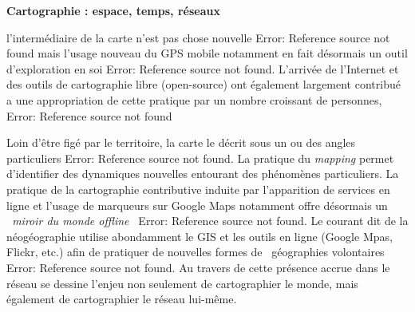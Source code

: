 \bigskip

{\bfseries\color{black}
Cartographie : espace, temps, r\'eseaux}

{\color{black}
\textsf{l'interm\'ediaire de la carte n'est pas chose nouvelle }\textsf{Error: Reference source not found}\textsf{ mais
l'usage nouveau d}\textsf{u GPS }\textsf{mobile notamment en fait d\'esormais un outil d'exploration en soi
}\textsf{Error: Reference source not found}\textsf{. L'arriv\'ee de l'Internet et des outils de cartographie libre
(open-source) ont \'egalement largement contribu\'e a une appropriation de cette pratique par un nombre croissant de
personnes, }\textsf{Error: Reference source not found}}


\bigskip

{\color{black}
\textsf{Loin d'\^etre fig\'e par le territoire, la carte le d\'ecrit sous un ou des angles particuliers }\textsf{Error:
Reference source not found}\textsf{. La pratique du }\textsf{\textit{mapping}}\textsf{ permet d'identifier des
dynamiques nouvelles entourant des ph\'enom\`enes particuliers. La pratique de la cartographie contributive induite par
l'apparition de services en ligne et l'usage de marqueurs sur Google Maps notamment offre d\'esormais un
}\textsf{\textit{{\guillemotleft}~miroir du monde offline~{\guillemotright}}}\textsf{ }\textsf{Error: Reference source
not found}\textsf{. Le courant dit de la n\'eog\'eographie utilise abondamment le GIS et les outils en ligne (Google
Mpas, Flickr, etc.) afin de pratiquer de nouvelles formes de {\guillemotleft}~g\'eographies
volontaires~{\guillemotright} }\textsf{Error: Reference source not found}\textsf{. Au travers de cette pr\'esence
accrue dans le r\'eseau se dessine l'enjeu non seulement de cartographier le monde, mais \'egalement de cartographier
le r\'eseau lui-m\^eme. }}


\bigskip


\bigskip


\bigskip


\bigskip

